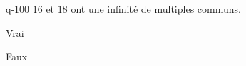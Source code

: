 \begin{truefalse}{q-100}
$16$ et $18$ ont une infinité de multiples communs.
\item* Vrai
\item Faux
\end{truefalse}

